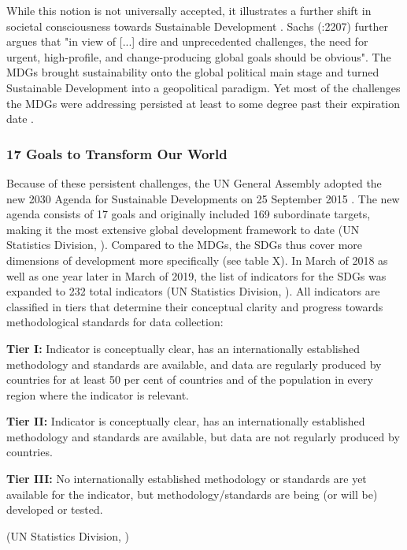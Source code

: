 		        \medskip
		        
		        While this notion is not universally accepted, it illustrates a further shift in societal consciousness towards Sustainable Development \citep{heikkurinen2019}. Sachs (\citeyear{sachs2012}:2207) further argues that "in view of [...] dire and unprecedented challenges, the need for urgent, high-profile, and change-producing global goals should be obvious". The MDGs brought sustainability onto the global political main stage and turned Sustainable Development into a geopolitical paradigm. Yet most of the challenges the MDGs were addressing persisted at least to some degree past their expiration date \citep{sachs2012}.
		        

		    \subsubsection{17 Goals to Transform Our World}
	            
	            Because of these persistent challenges, the UN General Assembly adopted the new 2030 Agenda for Sustainable Developments on 25 September 2015 \citep{unitednations2018}. The new agenda consists of 17 goals and originally included 169 subordinate targets, making it the most extensive global development framework to date (UN Statistics Division, \citeyear{unitednationsstatisticsdivision2019a}). Compared to the MDGs, the SDGs thus cover more dimensions of development more specifically (see table X). In March of 2018 as well as one year later in March of 2019, the list of indicators for the SDGs was expanded to 232 total indicators (UN Statistics Division, \citeyear{unitednationsstatisticsdivision2019}). All indicators are classified in tiers that determine their conceptual clarity and progress towards methodological standards for data collection:
	            
	            \medskip
	            
	            \begin{tcolorbox}
    				\textbf{Tier I:} Indicator is conceptually clear, has an internationally established methodology and standards are available, and data are regularly produced by countries for at least 50 per cent of countries and of the population in every region where the indicator is relevant.
    				\medskip
    				
    				\textbf{Tier II:} Indicator is conceptually clear, has an internationally established methodology and standards are available, but data are not regularly produced by countries.
    				\medskip
    				
    				\textbf{Tier III:} No internationally established methodology or standards are yet available for the indicator, but methodology/standards are being (or will be) developed or tested.
    				
    				\begin{center}
    				    (UN Statistics Division, \citeyear{unitednationsstatisticsdivision2019b})
    				\end{center}
			    \end{tcolorbox}

